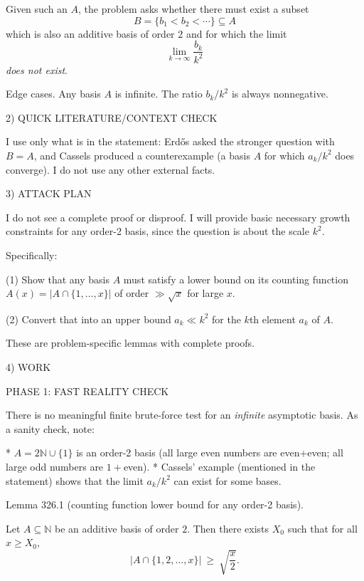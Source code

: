 Given such an $A$, the problem asks whether there must exist a subset
\[
B=\{b_1<b_2<\cdots\}\subseteq A
\]
which is also an additive basis of order $2$ and for which the limit
\[
\lim_{k\to\infty}\frac{b_k}{k^2}
\]
\emph{does not exist}.

Edge cases.
Any basis $A$ is infinite. The ratio $b_k/k^2$ is always nonnegative.


2) QUICK LITERATURE/CONTEXT CHECK

I use only what is in the statement: Erd\H{o}s asked the stronger question with $B=A$, and Cassels produced a counterexample (a basis $A$ for which $a_k/k^2$ does converge).
I do not use any other external facts.


3) ATTACK PLAN

I do not see a complete proof or disproof.
I will provide basic necessary growth constraints for any order-2 basis, since the question is about the scale $k^2$.

Specifically:

(1) Show that any basis $A$ must satisfy a lower bound on its counting function $A(x)=|A\cap\{1,\dots,x\}|$ of order $\gg\sqrt{x}$ for large $x$.

(2) Convert that into an upper bound $a_k\ll k^2$ for the $k$th element $a_k$ of $A$.

These are problem-specific lemmas with complete proofs.


4) WORK

PHASE 1: FAST REALITY CHECK

There is no meaningful finite brute-force test for an \emph{infinite} asymptotic basis. As a sanity check, note:

* $A=2\mathbb N\cup\{1\}$ is an order-2 basis (all large even numbers are even+even; all large odd numbers are $1+$even).
* Cassels' example (mentioned in the statement) shows that the limit $a_k/k^2$ can exist for some bases.


Lemma 326.1 (counting function lower bound for any order-2 basis).

Let $A\subseteq\mathbb N$ be an additive basis of order $2$.
Then there exists $X_0$ such that for all $x\ge X_0$,
\[
|A\cap\{1,2,\dots,x\}|\ \ge\ \sqrt{\frac{x}{2}}.
\]

